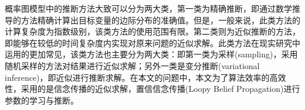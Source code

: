 概率图模型中的推断方法大致可以分为两大类，第一类为精确推断，即通过数学推导的方法精确计算出目标变量的边际分布的准确值。但是，一般来说，此类方法的计算复杂度为指数级别，该类方法的使用范围有限。第二类则为近似推断的方法，即能够在较低的时间复杂度内实现对原来问题的近似求解。此类方法在现实研究中运用的更加常见，该类方法也主要分为两大类：即第一类为采样(sampling)，采用随机采样的方法对结果进行近似求解；另外一类是变分推断(variational inference)，即近似进行推断求解。在本文的问题中，本文为了算法效率的高效性，采用的是信念传播的近似求解，置信信念传播(Loopy Belief Propagation)进行参数的学习与推断。










